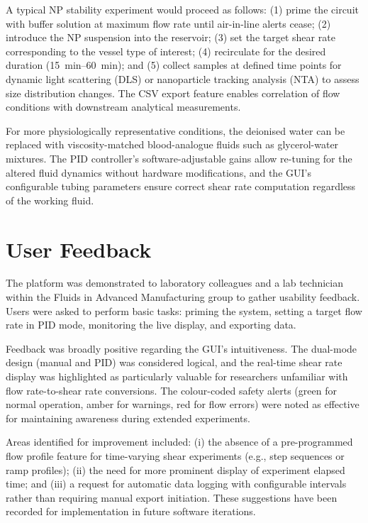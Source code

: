 A typical NP stability experiment would proceed as follows: (1) prime the circuit with buffer solution at maximum flow rate until air-in-line alerts cease; (2) introduce the NP suspension into the reservoir; (3) set the target shear rate corresponding to the vessel type of interest; (4) recirculate for the desired duration (\SIrange{15}{60}{\minute}); and (5) collect samples at defined time points for dynamic light scattering (DLS) or nanoparticle tracking analysis (NTA) to assess size distribution changes. The CSV export feature enables correlation of flow conditions with downstream analytical measurements.

For more physiologically representative conditions, the deionised water can be replaced with viscosity-matched blood-analogue fluids such as glycerol-water mixtures. The PID controller's software-adjustable gains allow re-tuning for the altered fluid dynamics without hardware modifications, and the GUI's configurable tubing parameters ensure correct shear rate computation regardless of the working fluid.

\section{User Feedback}

The platform was demonstrated to laboratory colleagues and a lab technician within the Fluids in Advanced Manufacturing group to gather usability feedback. Users were asked to perform basic tasks: priming the system, setting a target flow rate in PID mode, monitoring the live display, and exporting data.

Feedback was broadly positive regarding the GUI's intuitiveness. The dual-mode design (manual and PID) was considered logical, and the real-time shear rate display was highlighted as particularly valuable for researchers unfamiliar with flow rate-to-shear rate conversions. The colour-coded safety alerts (green for normal operation, amber for warnings, red for flow errors) were noted as effective for maintaining awareness during extended experiments.

Areas identified for improvement included: (i) the absence of a pre-programmed flow profile feature for time-varying shear experiments (e.g., step sequences or ramp profiles); (ii) the need for more prominent display of experiment elapsed time; and (iii) a request for automatic data logging with configurable intervals rather than requiring manual export initiation. These suggestions have been recorded for implementation in future software iterations.
